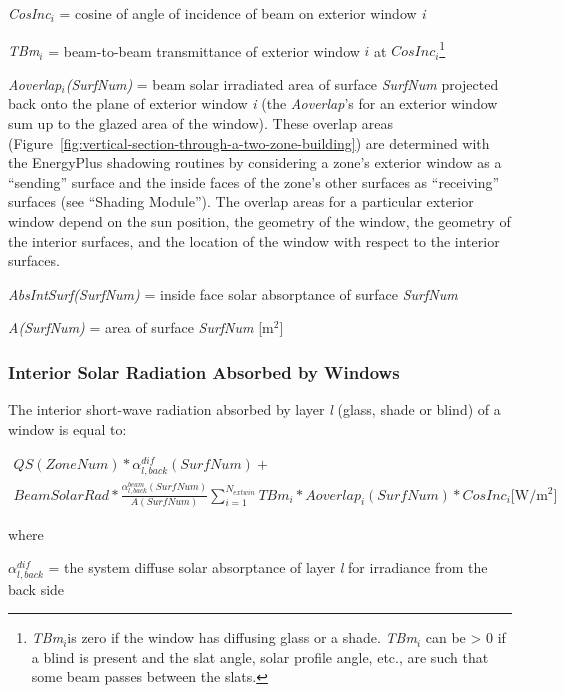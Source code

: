 \emph{CosInc\(_{i}\)} = cosine of angle of incidence of beam on exterior window \emph{i}

\emph{TBm\(_{i}\)} = beam-to-beam transmittance of exterior window \(i\) at \(CosInc_{i}\)\footnote{\emph{TBm\(_{i}\)}is zero if the window has diffusing glass or a shade. \emph{TBm\(_{i}\)} can be \textgreater{} 0 if a blind is present and the slat angle, solar profile angle, etc., are such that some beam passes between the slats.}

\emph{Aoverlap\(_{i}\)(SurfNum)} = beam solar irradiated area of surface \emph{SurfNum} projected back onto the plane of exterior window \emph{i} (the \emph{Aoverlap}'s for an exterior window sum up to the glazed area of the window). These overlap areas (Figure~\ref{fig:vertical-section-through-a-two-zone-building}) are determined with the EnergyPlus shadowing routines by considering a zone's exterior window as a ``sending'' surface and the inside faces of the zone's other surfaces as ``receiving'' surfaces (see ``Shading Module''). The overlap areas for a particular exterior window depend on the sun position, the geometry of the window, the geometry of the interior surfaces, and the location of the window with respect to the interior surfaces.

\emph{AbsIntSurf(SurfNum)} = inside face solar absorptance of surface \emph{SurfNum}

\emph{A(SurfNum)} = area of surface \emph{SurfNum} {[}m\(^{2}\){]}

\subsubsection{Interior Solar Radiation Absorbed by Windows}\label{interior-solar-radiation-absorbed-by-windows}

The interior short-wave radiation absorbed by layer \emph{l} (glass, shade or blind) of a window is equal to:

\begin{equation}
\begin{array}{l}QS(ZoneNum)*\alpha_{l,back}^{dif}(SurfNum) + \\BeamSolarRad*\frac{{\alpha_{l,back}^{beam}(SurfNum)}}{{A(SurfNum)}}\sum\limits_{i = 1}^{{N_{extwin}}} {TB{m_i}*Aoverla{p_i}(SurfNum)} *CosIn{c_i}{\mathrm{ [W/}}{{\mathrm{m}}^{\mathrm{2}}}]\end{array}
\end{equation}

where

\(\alpha_{l,back}^{dif}\) = the system diffuse solar absorptance of layer \emph{l} for irradiance from the back side

